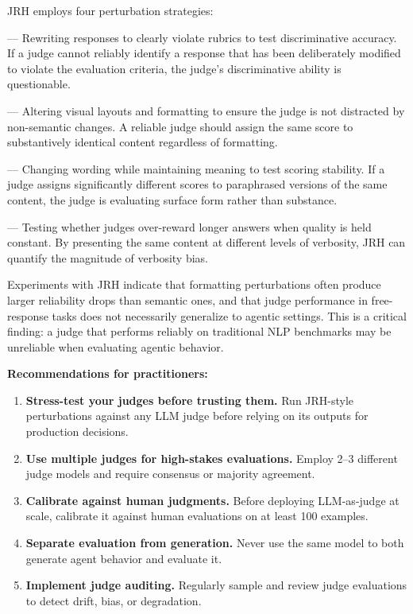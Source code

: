 JRH employs four perturbation strategies:

 --- Rewriting responses to clearly violate rubrics to test discriminative accuracy. If a judge cannot reliably identify a response that has been deliberately modified to violate the evaluation criteria, the judge's discriminative ability is questionable.

 --- Altering visual layouts and formatting to ensure the judge is not distracted by non-semantic changes. A reliable judge should assign the same score to substantively identical content regardless of formatting.

 --- Changing wording while maintaining meaning to test scoring stability. If a judge assigns significantly different scores to paraphrased versions of the same content, the judge is evaluating surface form rather than substance.

 --- Testing whether judges over-reward longer answers when quality is held constant. By presenting the same content at different levels of verbosity, JRH can quantify the magnitude of verbosity bias.

Experiments with JRH indicate that formatting perturbations often produce larger reliability drops than semantic ones, and that judge performance in free-response tasks does not necessarily generalize to agentic settings. This is a critical finding: a judge that performs reliably on traditional NLP benchmarks may be unreliable when evaluating agentic behavior.

\textbf{Recommendations for practitioners:}

\begin{enumerate}
    \item \textbf{Stress-test your judges before trusting them.} Run JRH-style perturbations against any LLM judge before relying on its outputs for production decisions.
    \item \textbf{Use multiple judges for high-stakes evaluations.} Employ 2--3 different judge models and require consensus or majority agreement.
    \item \textbf{Calibrate against human judgments.} Before deploying LLM-as-judge at scale, calibrate it against human evaluations on at least 100 examples.
    \item \textbf{Separate evaluation from generation.} Never use the same model to both generate agent behavior and evaluate it.
    \item \textbf{Implement judge auditing.} Regularly sample and review judge evaluations to detect drift, bias, or degradation.
\end{enumerate}